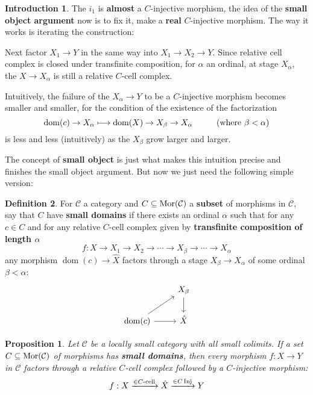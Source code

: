 \documentclass[a4paper]{article}
\theoremstyle{plain}
\newtheorem{prop}[thm]{Proposition}
\theoremstyle{definition}
\newtheorem{defn}{Definition}[section]
\newtheorem{intro}[defn]{Introduction}
\theoremstyle{remark}
\newcommand{\mc}[1]{\mathcal{#1}}
\newcommand{\mcC}{\mc C}
\DeclareMathOperator{\Mor}{\rm{Mor}}
\DeclareMathOperator{\Inj}{\rm{Inj}}
\DeclareMathOperator{\dom}{dom}
\begin{document}
\begin{intro}
            \par The $i_1$ is \textbf{almost} a $C$-injective morphism,
            the idea of the \textbf{small object argument} now is to fix it,
            make a \textbf{real} $C$-injective morphism. 
            The way it works is iterating the construction:
            \par Next factor $X_1 \to Y$ in the same way into $X_1 \to X_2 \to Y$.
            Since relative cell complex is closed under transfinite composition,
            for $\alpha$ an ordinal, at stage $X_{\alpha}$, the $X \to X_{\alpha}$
            is still a relative $C$-cell complex.
            \par Intuitively,
            the failure of the $X_{\alpha} \to Y$ to be a $C$-injective morphism becomes smaller and smaller,
            for the condition of the existence of the factorization
            $$\dom(c) \to X_{\alpha} \longmapsto \dom(X) \to X_{\beta} \to X_{\alpha} \hspace*{1cm} \text{(where  $\beta < \alpha$)}$$
            is less and less (intuitively) as the $X_\beta$ grow larger and larger.
            \par The concept of \textbf{small object} is just what makes this intuition precise and finishes the small object argument.
            But now we just need the following simple version:
        \end{intro}
        \begin{defn}
            For $\mcC$ a category and $C \subseteq \Mor(\mcC)$ a \textbf{subset} of morphisms in $\mcC$,
            say that $C$ have \textbf{small domains} if there exists an ordinal $\alpha$
            such that for any $c \in C$ and for any relative $C$-cell complex given by \textbf{transfinite composition of length $\alpha$}
            $$f : X \to X_1 \to X_2 \to \cdots \to X_{\beta} \to \cdots \to X_\alpha$$
            any morphism $\dom(c) \to \hat{X}$ factors through a stage $X_{\beta} \to X_{\alpha}$ of some ordinal $\beta < \alpha$:
            \[\begin{tikzcd}
                & {X_{\beta}} \\
                {\dom(c)} & {\hat{X}}
                \arrow[from=2-1, to=2-2]
                \arrow[from=1-2, to=2-2]
                \arrow[from=2-1, to=1-2]
            \end{tikzcd}\]

        \end{defn}

        \begin{prop}
            Let $\mcC$ be a locally small category with all small colimits.
            If a set $ C \subseteq  \Mor(\mcC)$ of morphisms has \textbf{small domains},
            then every morphism $f : X \rightarrow Y$ in $\mcC$ factors through a relative $C$-cell complex followed by a $C$-injective morphism:
            $$ f : X \xrightarrow{\in C \text{-cell}}  \hat{X} \xrightarrow{\in C \Inj} Y $$
        \end{prop}
\end{document}
